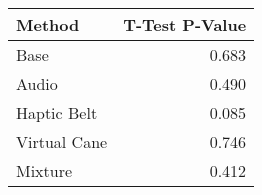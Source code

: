 
\centering
\begin{tabular}{lr}
\toprule
      Method &  T-Test P-Value \\
\midrule
        Base &           0.683 \\
       Audio &           0.490 \\
 Haptic Belt &           0.085 \\
Virtual Cane &           0.746 \\
     Mixture &           0.412 \\
\bottomrule
\end{tabular}
